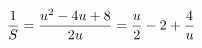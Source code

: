 \documentclass[preview]{standalone}
\begin{document}
\begin{align*}
\special{dvisvgm:raw <g id='unique000'>}\frac{1}{S}=\frac{u^2-4u+8}{2u}=\frac{u}{2}-2+\frac{4}{u}\special{dvisvgm:raw </g>}
\end{align*}
\end{document}
